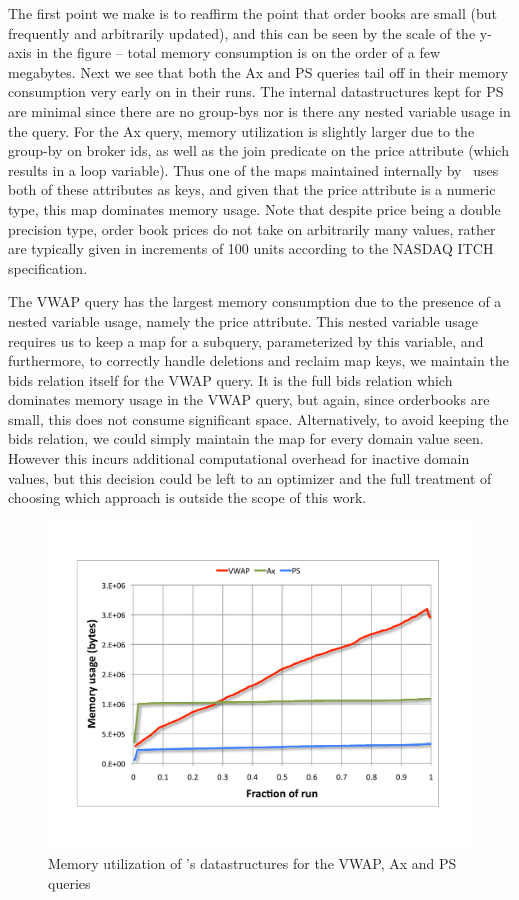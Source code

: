 The first point we make is to reaffirm the point that order books are small (but
frequently and arbitrarily updated), and this can be seen by the scale of the
y-axis in the figure -- total memory consumption is on the order of a few
megabytes. Next we see that both the Ax and PS queries tail off in their memory
consumption very early on in their runs. The internal datastructures kept for PS
are minimal since there are no group-bys nor is there any nested variable usage
in the query. For the Ax query, memory utilization is slightly larger due to the
group-by on broker ids, as well as the join predicate on the price attribute
(which results in a loop variable). Thus one of the maps maintained internally
by \compiler\ uses both of these attributes as keys, and given that the price
attribute is a numeric type, this map dominates memory usage. Note that despite
price being a double precision type, order book prices do not take on
arbitrarily many values, rather are typically given in increments of 100 units
according to the NASDAQ ITCH specification.

The VWAP query has the largest memory consumption due to the presence of a
nested variable usage, namely the price attribute. This nested variable usage
requires us to keep a map for a subquery, parameterized by this variable, and
furthermore, to correctly handle deletions and reclaim map keys, we maintain the
bids relation itself for the VWAP query. It is the full bids relation which
dominates memory usage in the VWAP query, but again, since orderbooks are
small, this does not consume significant space. Alternatively, to avoid keeping
the bids relation, we could simply maintain the map for every domain value
seen. However this incurs additional computational overhead for inactive domain
values, but this decision could be left to an optimizer and the full treatment
of choosing which approach is outside the scope of this work.

\begin{figure}[htbp]
\includegraphics[scale=0.33]{figures/orderbk-mem}
\caption{Memory utilization of \compiler's datastructures for the VWAP, Ax and
  PS queries}
\label{fig:orderbkmem}
\end{figure}

